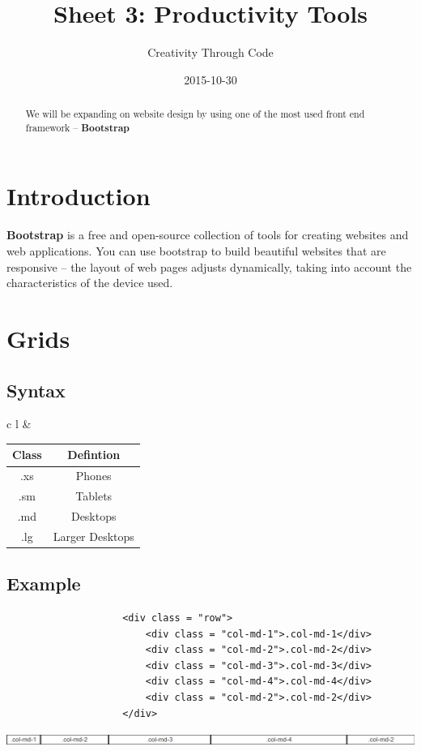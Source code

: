 \documentclass[11pt, letterpaper]{article}
\title{Sheet 3: Productivity Tools}
\date{2015-10-30}
\author{Creativity Through Code}
\begin{document}
	\maketitle
	\newpage
	\begin{abstract}
		We will be expanding on website design by using one of the most used front end framework -- \textbf{Bootstrap}
	\end{abstract}
	\section{Introduction}
		\textbf{Bootstrap} is a free and open-source collection of tools for creating websites and web applications. You can use bootstrap to build beautiful websites that are responsive -- the layout of web pages adjusts dynamically, taking into account the characteristics of the device used.
	\section{Grids}
		\subsection{Syntax}
			\begin{tabular}{c l}
				 &\begin{tabular}{c c}
					\toprule
					Class & Defintion \\\midrule
					.xs & Phones \\\midrule
					.sm & Tablets \\\midrule
					.md & Desktops \\\midrule
					.lg & Larger Desktops \\\bottomrule
				\end{tabular} 
			\end{tabular}
		\subsection{Example}
			\begin{center}
				\lstset{language=HTML, showspaces=false, showstringspaces=false, tabsize=1, breaklines=true}
				\begin{lstlisting}
					<div class = "row">
						<div class = "col-md-1">.col-md-1</div>
						<div class = "col-md-2">.col-md-2</div>
						<div class = "col-md-3">.col-md-3</div>
						<div class = "col-md-4">.col-md-4</div>
						<div class = "col-md-2">.col-md-2</div>
					</div>
				\end{lstlisting}
			\end{center}
			\includegraphics[scale = 0.37]{GridExample}
\end{document}
